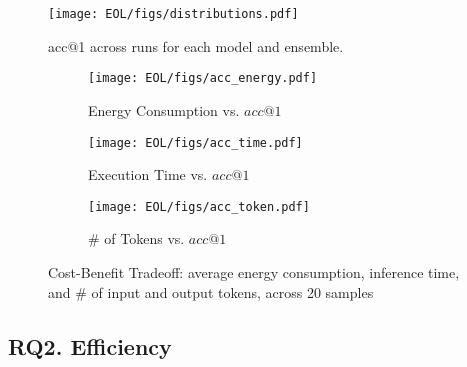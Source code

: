\begin{figure}[htbp]
\centerline{\texttt{[image: EOL/figs/distributions.pdf]}}
\caption{acc@1 across runs for each model and ensemble.}
\label{fig:acc_at_one_each}
\end{figure}
\begin{figure*}[h]
\centering
\begin{subfigure}[t]{0.32\textwidth}
\texttt{[image: EOL/figs/acc\_energy.pdf]}
\caption{Energy Consumption vs. $acc@1$\label{fig:acc_energy}}
\end{subfigure}
\begin{subfigure}[t]{0.32\textwidth}
\texttt{[image: EOL/figs/acc\_time.pdf]}
\caption{Execution Time vs. $acc@1$\label{fig:acc_time}}
\end{subfigure}
\begin{subfigure}[t]{0.32\textwidth}
\texttt{[image: EOL/figs/acc\_token.pdf]}
\caption{\# of Tokens vs. $acc@1$\label{fig:acc_tokens}}
\end{subfigure}
\caption{Cost-Benefit Tradeoff: average energy consumption, inference time, and \# of input and output tokens, across 20 samples}
\end{figure*}

\subsection{RQ2. Efficiency}




